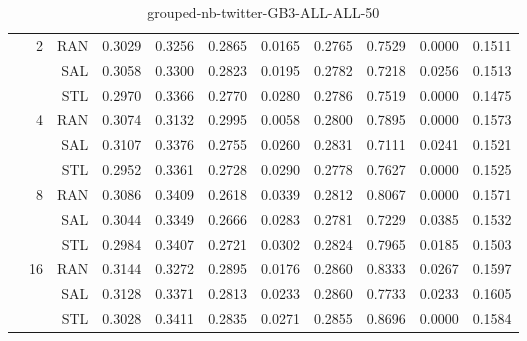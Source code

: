 \begin{center}
\begin{table}[htbp]
\begin{tabular}{ | r | r | r | r | r | r | r | r | r | r | r |}
 & \multirow{3}{*}{2} & RAN & 0.3029 & 0.3256 & 0.2865 & 0.0165 & 0.2765 & 0.7529 & 0.0000 & 0.1511\\ \cline{3-11}
 &   & SAL & 0.3058 & 0.3300 & 0.2823 & 0.0195 & 0.2782 & 0.7218 & 0.0256 & 0.1513\\ \cline{3-11}
 &   & STL & 0.2970 & 0.3366 & 0.2770 & 0.0280 & 0.2786 & 0.7519 & 0.0000 & 0.1475\\ \cline{2-11}
 & \multirow{3}{*}{4} & RAN & 0.3074 & 0.3132 & 0.2995 & 0.0058 & 0.2800 & 0.7895 & 0.0000 & 0.1573\\ \cline{3-11}
 &   & SAL & 0.3107 & 0.3376 & 0.2755 & 0.0260 & 0.2831 & 0.7111 & 0.0241 & 0.1521\\ \cline{3-11}
 &   & STL & 0.2952 & 0.3361 & 0.2728 & 0.0290 & 0.2778 & 0.7627 & 0.0000 & 0.1525\\ \cline{2-11}
 & \multirow{3}{*}{8} & RAN & 0.3086 & 0.3409 & 0.2618 & 0.0339 & 0.2812 & 0.8067 & 0.0000 & 0.1571\\ \cline{3-11}
 &   & SAL & 0.3044 & 0.3349 & 0.2666 & 0.0283 & 0.2781 & 0.7229 & 0.0385 & 0.1532\\ \cline{3-11}
 &   & STL & 0.2984 & 0.3407 & 0.2721 & 0.0302 & 0.2824 & 0.7965 & 0.0185 & 0.1503\\ \cline{2-11}
 & \multirow{3}{*}{16} & RAN & 0.3144 & 0.3272 & 0.2895 & 0.0176 & 0.2860 & 0.8333 & 0.0267 & 0.1597\\ \cline{3-11}
 &   & SAL & 0.3128 & 0.3371 & 0.2813 & 0.0233 & 0.2860 & 0.7733 & 0.0233 & 0.1605\\ \cline{3-11}
 &   & STL & 0.3028 & 0.3411 & 0.2835 & 0.0271 & 0.2855 & 0.8696 & 0.0000 & 0.1584\\ \cline{2-11}
\hline
\end{tabular}
\caption{grouped-nb-twitter-GB3-ALL-ALL-50}
\end{table}
\end{center}

